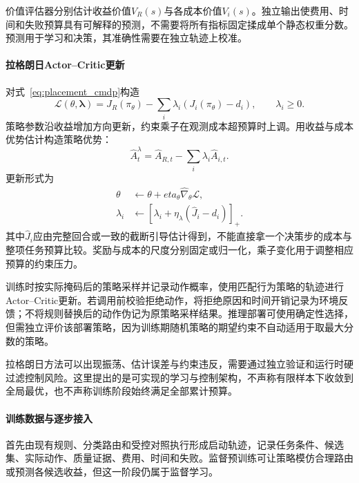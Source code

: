 价值评估器分别估计收益价值$V_R(s)$与各成本价值$V_i(s)$。独立输出使费用、时间和失败预算具有可解释的预测，不需要将所有指标固定揉成单个静态权重分数。预测用于学习和决策，其准确性需要在独立轨迹上校准。

\paragraph{拉格朗日Actor--Critic更新}
对式~\eqref{eq:placement_cmdp}构造
\begin{equation}
\mathcal{L}(\theta,\boldsymbol{\lambda})=
J_R(\pi_\theta)-\sum_i\lambda_i
\left(J_i(\pi_\theta)-d_i\right),
\qquad\lambda_i\geq0.
\label{eq:placement_lagrangian}
\end{equation}
策略参数沿收益增加方向更新，约束乘子在观测成本超预算时上调。用收益与成本优势估计构造策略优势：
\begin{equation}
\widehat{A}^{\lambda}_t=
\widehat{A}_{R,t}-\sum_i\lambda_i\widehat{A}_{i,t}.
\end{equation}
更新形式为
\begin{equation}
\begin{aligned}
\theta&\leftarrow\theta+eta_{\theta}
\widehat{\nabla}_{\theta}\mathcal{L},\\
\lambda_i&\leftarrow
\left[\lambda_i+\eta_{\lambda}
\left(\widehat{J}_i-d_i\right)\right]_+.
\end{aligned}
\end{equation}
其中$\widehat{J}_i$应由完整回合或一致的截断引导估计得到，不能直接拿一个决策步的成本与整项任务预算比较。奖励与成本的尺度分别固定或归一化，乘子变化用于调整相应预算的约束压力。

训练时按实际掩码后的策略采样并记录动作概率，使用匹配行为策略的轨迹进行Actor--Critic更新。若调用前校验拒绝动作，将拒绝原因和时间开销记录为环境反馈；不将规则替换后的动作伪记为原策略采样结果。推理部署可使用确定性选择，但需独立评价该部署策略，因为训练期随机策略的期望约束不自动适用于取最大分数的策略。

拉格朗日方法可以出现振荡、估计误差与约束违反，需要通过独立验证和运行时硬过滤控制风险。这里提出的是可实现的学习与控制架构，不声称有限样本下收敛到全局最优，也不声称训练阶段始终满足全部累计预算。

\paragraph{训练数据与逐步接入}
首先由现有规则、分类路由和受控对照执行形成启动轨迹，记录任务条件、候选集、实际动作、质量证据、费用、时间和失败。监督预训练可让策略模仿合理路由或预测各候选收益，但这一阶段仍属于监督学习。

